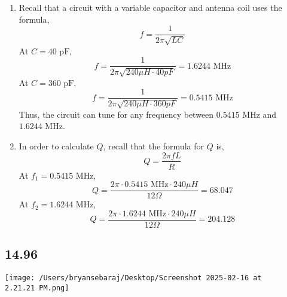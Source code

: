 \documentclass{article}
\begin{document}
\begin{enumerate}[label=(\alph*)]
    \item Recall that a circuit with a variable capacitor and antenna coil uses the formula, 
        $$f=\frac{1}{2\pi \sqrt{LC}}$$
        At $C=40 \text{ pF}$, $$f=\frac{1}{2\pi \sqrt{240 \mu H \cdot 40 pF}}=1.6244 \text{ MHz}$$
        At $C=360 \text{ pF}$, $$f=\frac{1}{2\pi \sqrt{240 \mu H \cdot 360 pF}}=0.5415 \text{ MHz}$$
        Thus, the circuit can tune for any frequency between $0.5415 \text{ MHz}$ and $1.6244 \text{ MHz}$.
    \item In order to calculate $Q$, recall that the formula for $Q$ is,
        $$Q=\frac{2\pi f L}{R}$$
        At $f_1=0.5415 \text{ MHz}$, $$Q=\frac{2\pi \cdot 0.5415 \text{ MHz} \cdot 240 \mu H}{12 \Omega}=68.047$$
        At $f_2=1.6244 \text{ MHz}$, $$Q=\frac{2\pi \cdot 1.6244 \text{ MHz} \cdot 240 \mu H}{12 \Omega}=204.128$$

\end{enumerate}


\subsection*{14.96}
\texttt{[image: /Users/bryansebaraj/Desktop/Screenshot 2025-02-16 at 2.21.21 PM.png]}
\end{document}
